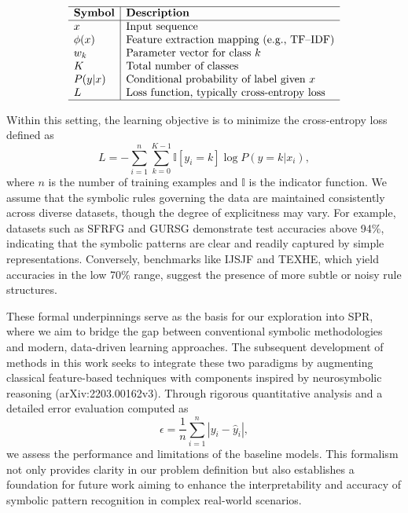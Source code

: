 \documentclass{article}
\begin{document}
\[
\begin{array}{l|l}
\hline
\textbf{Symbol} & \textbf{Description} \\ \hline
x & \text{Input sequence} \\
\phi(x) & \text{Feature extraction mapping (e.g., TF–IDF)} \\
w_k & \text{Parameter vector for class } k \\
K & \text{Total number of classes} \\
P(y|x) & \text{Conditional probability of label given } x \\
L & \text{Loss function, typically cross-entropy loss} \\ \hline
\end{array}
\]

Within this setting, the learning objective is to minimize the cross-entropy loss defined as
\[
L = -\sum_{i=1}^{n} \sum_{k=0}^{K-1} \mathbb{I}[y_i = k] \log P(y=k|x_i),
\]
where \( n \) is the number of training examples and \( \mathbb{I} \) is the indicator function. We assume that the symbolic rules governing the data are maintained consistently across diverse datasets, though the degree of explicitness may vary. For example, datasets such as SFRFG and GURSG demonstrate test accuracies above 94\%, indicating that the symbolic patterns are clear and readily captured by simple representations. Conversely, benchmarks like IJSJF and TEXHE, which yield accuracies in the low 70\% range, suggest the presence of more subtle or noisy rule structures.

These formal underpinnings serve as the basis for our exploration into SPR, where we aim to bridge the gap between conventional symbolic methodologies and modern, data-driven learning approaches. The subsequent development of methods in this work seeks to integrate these two paradigms by augmenting classical feature-based techniques with components inspired by neurosymbolic reasoning (arXiv:2203.00162v3). Through rigorous quantitative analysis and a detailed error evaluation computed as
\[
\epsilon = \frac{1}{n} \sum_{i=1}^n \left| y_i - \hat{y}_i \right|,
\]
we assess the performance and limitations of the baseline models. This formalism not only provides clarity in our problem definition but also establishes a foundation for future work aiming to enhance the interpretability and accuracy of symbolic pattern recognition in complex real-world scenarios.
\end{document}
